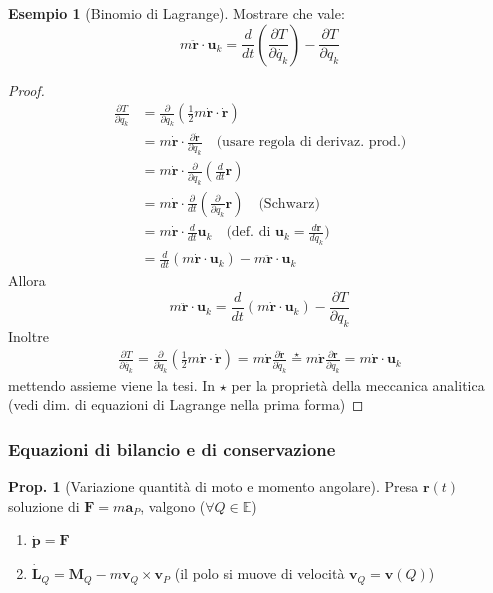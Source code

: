 \documentclass[a4paper,10pt]{article}
\theoremstyle{definition}
\newcommand{\bv}{\boldsymbol} %
\theoremstyle{indentdefinition}
\theoremstyle{indenttheorem}
\newtheorem{prop}{Prop.}
\theoremstyle{myremark}
\newtheorem{example*}{Esempio}
\theoremstyle{indentgeneral}
\begin{document}
\begin{example*}[Binomio di Lagrange]
    Mostrare che vale:
    $$m\ddot{\bv{r}}\cdot\bv{u}_k=\frac{d}{dt}\left(\frac{\partial T}{\partial \dot{q_k}}\right)-\frac{\partial T}{\partial q_k}$$
   
\end{example*}
\begin{proof} 
    \begin{align*}
            \frac{\partial T}{\partial q_k} &=  \frac{\partial }{\partial q_k}(\frac{1}{2}m\dot{\bv{r}}\cdot\dot{\bv{r}}) \\
            &=m\dot{\bv{r}}\cdot\frac{\partial \dot{\bv{r}}}{\partial q_k} \quad \text{(usare regola di derivaz. prod.)} \\
            &= m\dot{\bv{r}}\cdot\frac{\partial}{\partial q_k}\left(\frac{d}{dt}\bv{r}\right) \\
            &= m\dot{\bv{r}}\cdot\frac{\partial}{dt}\left(\frac{\partial}{\partial q_k}\bv{r}\right) \quad \text{(Schwarz)}\\
            &=m\dot{\bv{r}}\cdot\frac{d}{dt}\bv{u}_k \quad \text{(def. di $\bv{u}_k=\frac{d\bv{r}}{dq_k}$)}\\
            &= \frac{d}{dt}(m\dot{\bv{r}}\cdot\bv{u}_k)-m\ddot{\bv{r}}\cdot\bv{u}_k
    \end{align*}
    Allora 
    $$m\ddot{\bv{r}}\cdot\bv{u}_k=\frac{d}{dt}(m\dot{\bv{r}}\cdot\bv{u}_k)- \frac{\partial T}{\partial q_k}$$
    Inoltre 
    \begin{align*}
        \frac{\partial T}{\partial \dot{q_k}}=\frac{\partial}{\partial \dot{q}_k}\left(\frac{1}{2}m\bv{\dot{r}}\cdot\bv{\dot{r}}\right)=m\bv{\dot{r}}\frac{\partial \dot{\bv{r}}}{\partial \dot{q}_k}\overset{\star}{=}m\bv{\dot{r}}\frac{\partial \bv{r}}{\partial q_k}=m\dot{\bv{r}}\cdot\bv{u}_k
    \end{align*}
    mettendo assieme viene la tesi. In $\star$ per la proprietà della meccanica analitica (vedi dim. di equazioni di Lagrange nella prima forma)
\end{proof}

\subsubsection{Equazioni di bilancio e di conservazione}
\begin{prop}[Variazione quantità di moto e momento angolare]
Presa $\boldsymbol{r}\left(t\right)$ soluzione di $\boldsymbol{F}=m\boldsymbol{a}_{P}$,
valgono ($\forall Q\in\mathbb{E}$)
\begin{enumerate}
        \item $\dot{\boldsymbol{p}}  =\boldsymbol{F}$
        \item $\dot{\boldsymbol{L}}_{Q}  =\boldsymbol{M}_{Q}-m\boldsymbol{v}_{Q}\times\boldsymbol{v}_{P}$ (il polo si muove di velocità $\bv{v}_Q=\bv{v}(Q)$)
    \end{enumerate}

\end{prop}
\end{document}
